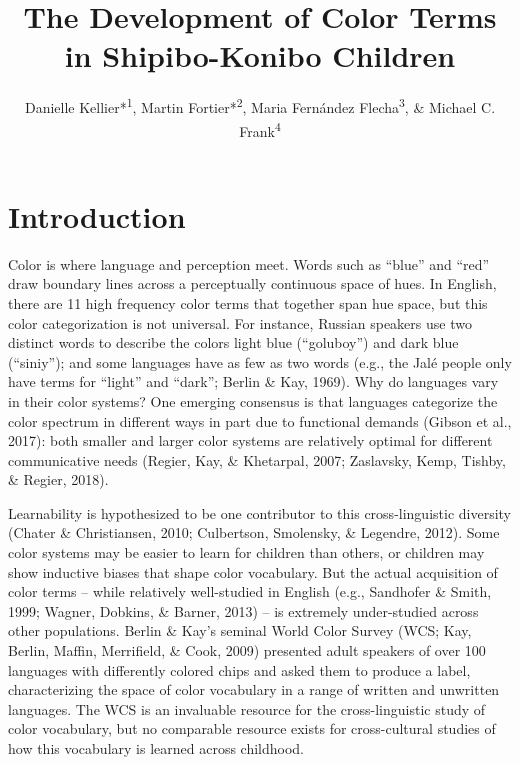 \documentclass[
  english,
  ,man,floatsintext]{apa6}
\title{The Development of Color Terms in Shipibo-Konibo Children}
\author{Danielle Kellier*\textsuperscript{1}, Martin Fortier*\textsuperscript{2}, Maria Fernández Flecha\textsuperscript{3}, \& Michael C. Frank\textsuperscript{4}}
\date{}
\affiliation{\vspace{0.5cm}\textsuperscript{1} University of Pennsylvania\\\textsuperscript{2} PSL Research University\\\textsuperscript{3} Pontificia Universidad Católica del Perú\\\textsuperscript{4} Stanford University}
\begin{document}
\maketitle

\hypertarget{introduction}{%
\section{Introduction}\label{introduction}}

Color is where language and perception meet. Words such as \enquote{blue} and \enquote{red} draw boundary lines across a perceptually continuous space of hues. In English, there are 11 high frequency color terms that together span hue space, but this color categorization is not universal. For instance, Russian speakers use two distinct words to describe the colors light blue (\enquote{goluboy}) and dark blue (\enquote{siniy}); and some languages have as few as two words (e.g., the Jalé people only have terms for ``light'' and ``dark''; Berlin \& Kay, 1969). Why do languages vary in their color systems? One emerging consensus is that languages categorize the color spectrum in different ways in part due to functional demands (Gibson et al., 2017): both smaller and larger color systems are relatively optimal for different communicative needs (Regier, Kay, \& Khetarpal, 2007; Zaslavsky, Kemp, Tishby, \& Regier, 2018).

Learnability is hypothesized to be one contributor to this cross-linguistic diversity (Chater \& Christiansen, 2010; Culbertson, Smolensky, \& Legendre, 2012). Some color systems may be easier to learn for children than others, or children may show inductive biases that shape color vocabulary. But the actual acquisition of color terms -- while relatively well-studied in English (e.g., Sandhofer \& Smith, 1999; Wagner, Dobkins, \& Barner, 2013) -- is extremely under-studied across other populations. Berlin \& Kay's seminal World Color Survey (WCS; Kay, Berlin, Maffin, Merrifield, \& Cook, 2009) presented adult speakers of over 100 languages with differently colored chips and asked them to produce a label, characterizing the space of color vocabulary in a range of written and unwritten languages. The WCS is an invaluable resource for the cross-linguistic study of color vocabulary, but no comparable resource exists for cross-cultural studies of how this vocabulary is learned across childhood.
\end{document}
